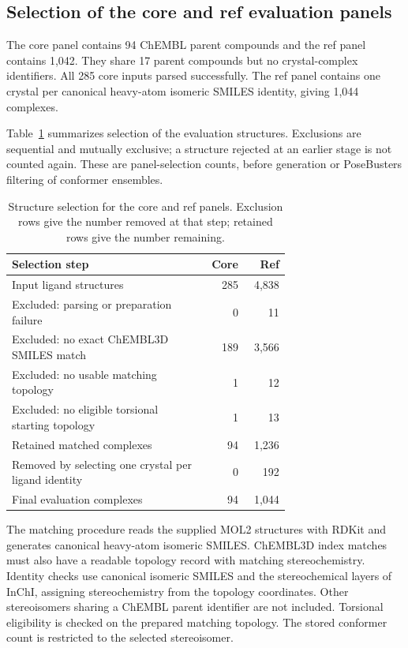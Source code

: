 \subsection*{Selection of the core and ref evaluation panels}

The core panel contains 94 ChEMBL parent compounds and the ref panel contains
1,042. They share 17 parent compounds but no crystal-complex identifiers. All 285
core inputs parsed successfully. The ref panel contains one crystal per
canonical heavy-atom isomeric SMILES identity, giving 1,044 complexes.

Table~\ref{tab:selection-counts} summarizes selection of the evaluation structures.
Exclusions are sequential and mutually exclusive; a structure rejected
at an earlier stage is not counted again. These are panel-selection counts, before
generation or PoseBusters filtering of conformer ensembles.

\begin{table}[htbp]
\centering
\caption{Structure selection for the core and ref panels. Exclusion rows give the
number removed at that step; retained rows give the number remaining.}
\label{tab:selection-counts}
\begin{tabular}{@{}p{0.70\linewidth}rr@{}}
\toprule
Selection step & Core & Ref \\
\midrule
Input ligand structures & 285 & 4,838 \\
Excluded: parsing or preparation failure & 0 & 11 \\
Excluded: no exact ChEMBL3D SMILES match & 189 & 3,566 \\
Excluded: no usable matching topology & 1 & 12 \\
Excluded: no eligible torsional starting topology & 1 & 13 \\
\midrule
Retained matched complexes & 94 & 1,236 \\
Removed by selecting one crystal per ligand identity & 0 & 192 \\
\midrule
Final evaluation complexes & 94 & 1,044 \\
\bottomrule
\end{tabular}
\end{table}

The matching procedure reads the supplied MOL2 structures with RDKit and generates
canonical heavy-atom isomeric SMILES. ChEMBL3D index matches must also have a readable
topology record with matching stereochemistry. Identity checks use canonical isomeric
SMILES and the stereochemical layers of InChI, assigning stereochemistry from the
topology coordinates. Other stereoisomers sharing a ChEMBL parent identifier are not
included. Torsional eligibility is checked on the prepared matching topology. The
stored conformer count is restricted to the selected stereoisomer.

